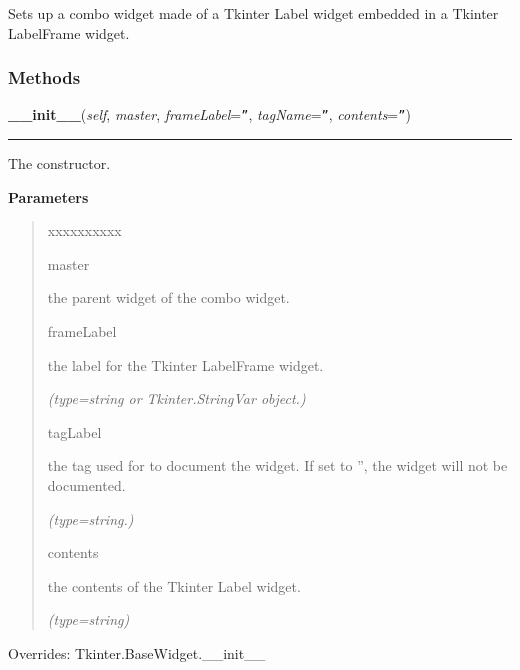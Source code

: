Sets up a combo widget made of a Tkinter Label widget embedded in a Tkinter
LabelFrame widget.



  \subsubsection{Methods}

    \vspace{0.5ex}

\hspace{.8\funcindent}\begin{boxedminipage}{\funcwidth}

    \raggedright \textbf{\_\_init\_\_}(\textit{self}, \textit{master}, \textit{frameLabel}={\tt ''}, \textit{tagName}={\tt ''}, \textit{contents}={\tt ''})

    \vspace{-1.5ex}

    \rule{\textwidth}{0.5\fboxrule}
\setlength{\parskip}{2ex}
    The constructor.

\setlength{\parskip}{1ex}
      \textbf{Parameters}
      \vspace{-1ex}

      \begin{quote}
        \begin{Ventry}{xxxxxxxxxx}

          \item[master]

          the parent widget of the combo widget.

          \item[frameLabel]

          the label for the Tkinter LabelFrame widget.

            {\it (type=string or Tkinter.StringVar object.)}

          \item[tagLabel]

          the tag used for to document the widget. If set to '', the widget
          will not be documented.

            {\it (type=string.)}

          \item[contents]

          the contents of the Tkinter Label widget.

            {\it (type=string)}

        \end{Ventry}

      \end{quote}

      Overrides: Tkinter.BaseWidget.\_\_init\_\_

    \end{boxedminipage}

